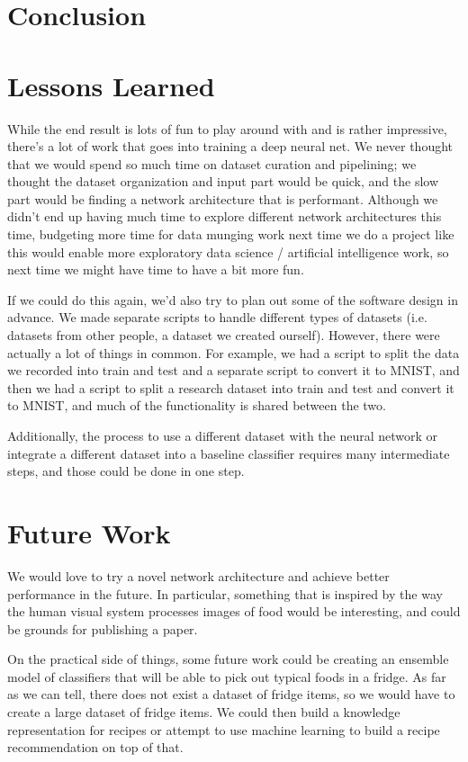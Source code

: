 \documentclass[leqno]{article}
\begin{document}
\section{Conclusion}

\section{Lessons Learned}
While the end result is lots of fun to play around with and is rather
impressive, there's a lot of work that goes into training a deep neural net. We never
thought that we would spend so much time on dataset curation and pipelining; we
thought the dataset organization and input part would be quick, and the slow
part would be finding a network architecture that is performant. Although we
didn't end up having much time to explore different network architectures this
time, budgeting more time for data munging work next time we do a project like
this would enable more exploratory data science / artificial intelligence work,
so next time we might have time to have a bit more fun.

If we could do this again, we'd also try to plan out some of the software design
in advance. We made separate scripts to handle different types of
datasets (i.e. datasets from other people, a dataset we created ourself).
However, there were actually a lot of things in common. For example, we had a
script to split the data we recorded into train and test and a separate script
to convert it to MNIST, and then we had a script to split a research dataset
into train and test and convert it to MNIST, and much of the functionality is
shared between the two.

Additionally, the process to use a different dataset with the neural network or 
integrate a different dataset into a baseline classifier
requires many intermediate steps, and those could be done in one step.

\section{Future Work}
We would love to try a novel network architecture and achieve better performance
in the future. In particular, something that is inspired by the way the human
visual system processes images of food would be interesting, and could be
grounds for publishing a paper.

On the practical side of things, some future work could be creating an ensemble
model of classifiers that will be able to pick out typical foods in a fridge.
As far as we can tell, there does not exist a dataset of fridge items, so we
would have to create a large dataset of fridge items. We could then build a
knowledge representation for recipes or attempt to use machine learning to build
a recipe recommendation on top of that.
\end{document}
